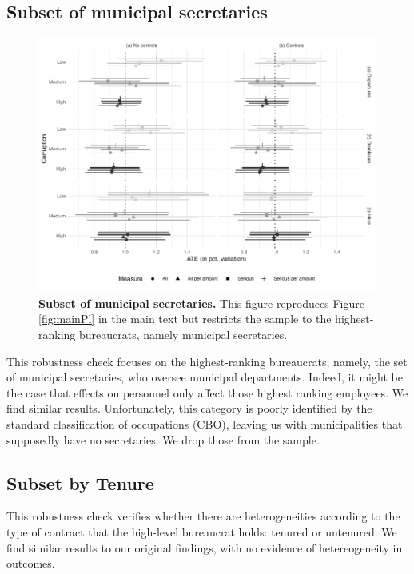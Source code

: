 \documentclass[12pt,a4paper]{article}
\theoremstyle{definition}
\begin{document}
{\subsection{Subset of municipal secretaries}
\label{app:secretariesRobustness}

\begin{figure}[H]
    \centering
    \includegraphics{figures/plSubset}
    \caption{{\bf Subset of municipal secretaries.} This figure reproduces Figure \ref{fig:mainPl} in the main text but restricts the sample to the highest-ranking bureaucrats, namely municipal secretaries.}
    \label{fig:plSubset}
\end{figure}

This robustness check focuses on the highest-ranking bureaucrats; namely, the set of municipal secretaries, who oversee municipal departments. Indeed, it might be the case that effects on personnel only affect those highest ranking employees. We find similar results. Unfortunately, this category is poorly identified by the standard classification of occupations (CBO), leaving us with municipalities that supposedly have no secretaries. We drop those from the sample. 


\subsection{Subset by Tenure}
\label{app:tenuredRobustness}

This robustness check verifies whether there are heterogeneities according to the type of contract that the high-level bureaucrat holds: tenured or untenured. We find similar results to our original findings, with no evidence of hetereogeneity in outcomes.

}
\end{document}
